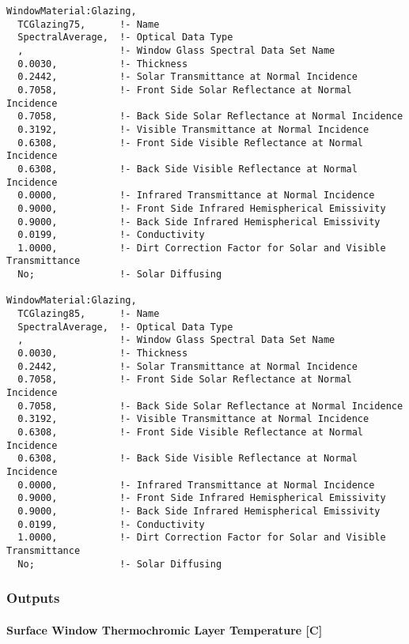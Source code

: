 \begin{lstlisting}
WindowMaterial:Glazing,
  TCGlazing75,      !- Name
  SpectralAverage,  !- Optical Data Type
  ,                 !- Window Glass Spectral Data Set Name
  0.0030,           !- Thickness
  0.2442,           !- Solar Transmittance at Normal Incidence
  0.7058,           !- Front Side Solar Reflectance at Normal Incidence
  0.7058,           !- Back Side Solar Reflectance at Normal Incidence
  0.3192,           !- Visible Transmittance at Normal Incidence
  0.6308,           !- Front Side Visible Reflectance at Normal Incidence
  0.6308,           !- Back Side Visible Reflectance at Normal Incidence
  0.0000,           !- Infrared Transmittance at Normal Incidence
  0.9000,           !- Front Side Infrared Hemispherical Emissivity
  0.9000,           !- Back Side Infrared Hemispherical Emissivity
  0.0199,           !- Conductivity
  1.0000,           !- Dirt Correction Factor for Solar and Visible Transmittance
  No;               !- Solar Diffusing

WindowMaterial:Glazing,
  TCGlazing85,      !- Name
  SpectralAverage,  !- Optical Data Type
  ,                 !- Window Glass Spectral Data Set Name
  0.0030,           !- Thickness
  0.2442,           !- Solar Transmittance at Normal Incidence
  0.7058,           !- Front Side Solar Reflectance at Normal Incidence
  0.7058,           !- Back Side Solar Reflectance at Normal Incidence
  0.3192,           !- Visible Transmittance at Normal Incidence
  0.6308,           !- Front Side Visible Reflectance at Normal Incidence
  0.6308,           !- Back Side Visible Reflectance at Normal Incidence
  0.0000,           !- Infrared Transmittance at Normal Incidence
  0.9000,           !- Front Side Infrared Hemispherical Emissivity
  0.9000,           !- Back Side Infrared Hemispherical Emissivity
  0.0199,           !- Conductivity
  1.0000,           !- Dirt Correction Factor for Solar and Visible Transmittance
  No;               !- Solar Diffusing
\end{lstlisting}

\subsubsection{Outputs}\label{outputs-3-019}

\paragraph{Surface Window Thermochromic Layer Temperature {[}C{]}}\label{surface-window-thermochromic-layer-temperature-c}

